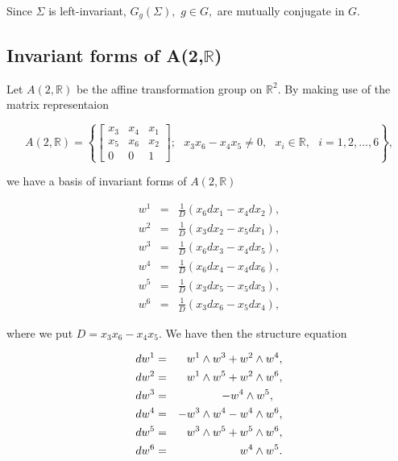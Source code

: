 \documentclass{amsproc}
\theoremstyle{remark}
\numberwithin{equation}{section}
\begin{document}
Since $\Sigma$ is left-invariant, $G_{g}(\Sigma ),$ $g\in G,$ are mutually
conjugate in $G$.

\subsection{Invariant forms of A(2,$\mathbb{R}
$)}

Let $A(2,\mathbb{R}
)$ be the affine transformation group on $\mathbb{R}
^{2}.$ By making use of the matrix representaion

\begin{equation*}
A(2,\mathbb{R}
)=\left\{ 
\begin{bmatrix}
x_{3} & x_{4} & x_{1} \\ 
x_{5} & x_{6} & x_{2} \\ 
0 & 0 & 1\end{bmatrix};\text{ }x_{3}x_{6}-x_{4}x_{5}\neq 0,\text{ }x_{i}\in 
\mathbb{R}
,\text{ }i=1,2,\ldots ,6\right\} ,
\end{equation*}

we have a basis of invariant forms of $A(2,\mathbb{R}
)$

\begin{eqnarray*}
w^{1} &=&\frac{1}{D}\left( x_{6}dx_{1}-x_{4}dx_{2}\right) , \\
w^{2} &=&\frac{1}{D}\left( x_{3}dx_{2}-x_{5}dx_{1}\right) , \\
w^{3} &=&\frac{1}{D}\left( x_{6}dx_{3}-x_{4}dx_{5}\right) , \\
w^{4} &=&\frac{1}{D}\left( x_{6}dx_{4}-x_{4}dx_{6}\right) , \\
w^{5} &=&\frac{1}{D}\left( x_{3}dx_{5}-x_{5}dx_{3}\right) , \\
w^{6} &=&\frac{1}{D}\left( x_{3}dx_{6}-x_{5}dx_{4}\right) ,
\end{eqnarray*}

where we put $D=x_{3}x_{6}-x_{4}x_{5}.$ We have then the structure equation

\begin{eqnarray}
dw^{1} &=&w^{1}\wedge w^{3}+w^{2}\wedge w^{4}, \notag \\
dw^{2} &=&w^{1}\wedge w^{5}+w^{2}\wedge w^{6}, \notag\\
dw^{3} &=&-w^{4}\wedge w^{5},
\label{eq:structure}
 \text{\ \ } \\
dw^{4} &=&-w^{3}\wedge w^{4}-w^{4}\wedge w^{6}, \notag \\
dw^{5} &=&w^{3}\wedge w^{5}+w^{5}\wedge w^{6}, \notag \\
dw^{6} &=&w^{4}\wedge w^{5}. \notag
\end{eqnarray}
\end{document}

